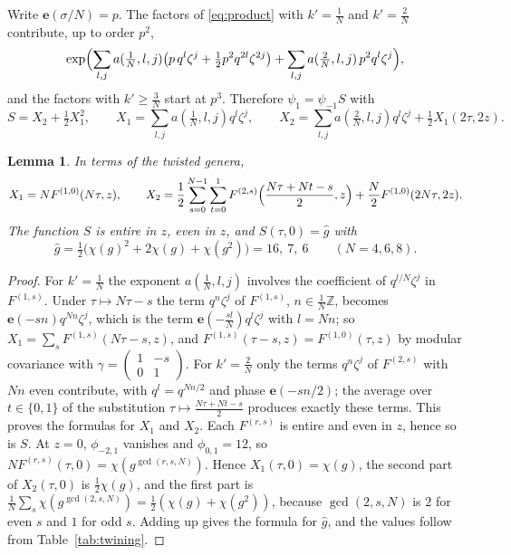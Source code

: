 \documentclass[11pt]{amsart}
\newtheorem{lemma}[theorem]{Lemma}
\theoremstyle{definition}
\newcommand{\ZZ}{\mathbb{Z}}
\newcommand{\e}{\mathbf{e}}
\newcommand{\gh}{\hat g}
\begin{document}
Write $\e(\sigma/N)=p$. The factors of \eqref{eq:product} with $k'=\frac1N$ and $k'=\frac2N$ contribute, up to order $p^2$,
\[
\exp\Bigl(\sum_{l,j}a(\tfrac1N,l,j)\bigl(p\,q^l\zeta^j+\tfrac12p^2q^{2l}\zeta^{2j}\bigr)+\sum_{l,j}a(\tfrac2N,l,j)\,p^2q^l\zeta^j\Bigr),
\]
and the factors with $k'\ge\frac3N$ start at $p^3$. Therefore $\psi_1=\psi_{-1}S$ with
\begin{equation}\label{eq:S}
S=X_2+\tfrac12X_1^2,\qquad X_1=\sum_{l,j}a(\tfrac1N,l,j)q^l\zeta^j,\qquad X_2=\sum_{l,j}a(\tfrac2N,l,j)q^l\zeta^j+\tfrac12X_1(2\tau,2z).
\end{equation}

\begin{lemma}\label{lem:S}
In terms of the twisted genera,
\[
X_1=NF^{(1,0)}(N\tau,z),\qquad X_2=\frac12\sum_{s=0}^{N-1}\sum_{t=0}^1F^{(2,s)}\Bigl(\frac{N\tau+Nt-s}2,z\Bigr)+\frac N2F^{(1,0)}(2N\tau,2z).
\]
The function $S$ is entire in $z$, even in $z$, and $S(\tau,0)=\gh$ with
\[
\gh=\tfrac12\bigl(\chi(g)^2+2\chi(g)+\chi(g^2)\bigr)=16,\ 7,\ 6\qquad(N=4,6,8).
\]
\end{lemma}

\begin{proof}
For $k'=\frac1N$ the exponent $a(\frac1N,l,j)$ involves the coefficient of $q^{l/N}\zeta^j$ in $F^{(1,s)}$. Under $\tau\mapsto N\tau-s$ the term $q^n\zeta^j$ of $F^{(1,s)}$, $n\in\frac1N\ZZ$, becomes $\e(-sn)q^{Nn}\zeta^j$, which is the term $\e(-\frac{sl}N)q^l\zeta^j$ with $l=Nn$; so $X_1=\sum_sF^{(1,s)}(N\tau-s,z)$, and $F^{(1,s)}(\tau-s,z)=F^{(1,0)}(\tau,z)$ by modular covariance with $\gamma=\left(\begin{smallmatrix}1&-s\\0&1\end{smallmatrix}\right)$. For $k'=\frac2N$ only the terms $q^n\zeta^j$ of $F^{(2,s)}$ with $Nn$ even contribute, with $q^l=q^{Nn/2}$ and phase $\e(-sn/2)$; the average over $t\in\{0,1\}$ of the substitution $\tau\mapsto\frac{N\tau+Nt-s}2$ produces exactly these terms. This proves the formulas for $X_1$ and $X_2$. Each $F^{(r,s)}$ is entire and even in $z$, hence so is $S$. At $z=0$, $\phi_{-2,1}$ vanishes and $\phi_{0,1}=12$, so $NF^{(r,s)}(\tau,0)=\chi(g^{\gcd(r,s,N)})$. Hence $X_1(\tau,0)=\chi(g)$, the second part of $X_2(\tau,0)$ is $\frac12\chi(g)$, and the first part is $\frac1N\sum_s\chi(g^{\gcd(2,s,N)})=\frac12(\chi(g)+\chi(g^2))$, because $\gcd(2,s,N)$ is $2$ for even $s$ and $1$ for odd $s$. Adding up gives the formula for $\gh$, and the values follow from Table~\ref{tab:twining}.
\end{proof}
\end{document}
